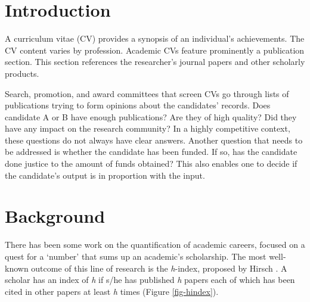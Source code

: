   \chapter{Introduction}\label{chap:Intro}
A curriculum vitae (CV) provides a synopsis of an individual's achievements. The CV content varies by profession. Academic CVs feature prominently a publication section. This section references the researcher's journal papers and other scholarly products.

Search, promotion, and award committees that screen CVs go through lists of publications trying to form opinions about the candidates' records. Does candidate A or B have enough publications? Are they of high quality? Did they have any impact on the research community?
In a highly competitive context, these questions do not always have clear answers. Another question that needs to be addressed is whether the candidate has been funded. If so, has the candidate done justice to the amount of funds obtained? This also enables one to decide if the candidate's output is in proportion with the input.














\chapter{Background}\label{chap:Background}

There has been some work on the quantification of academic careers, focused on a quest for a `number' that sums up an academic's scholarship. The most well-known outcome of this line of research is the {\it h}-index, proposed by Hirsch \cite{Hirsch:2005}. A scholar has an index of {\it h} if s/he has published {\it h} papers each of which has been cited in other papers at least {\it h} times (Figure \ref{fig-hindex}).

